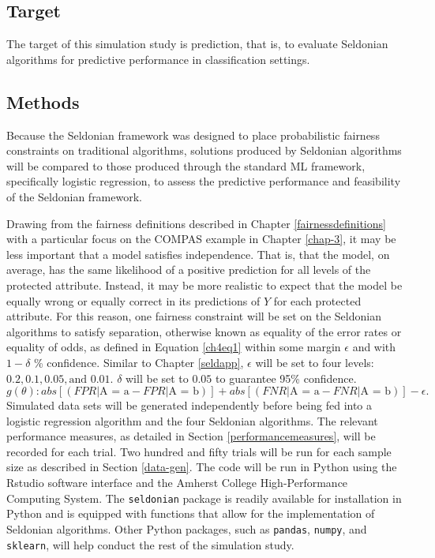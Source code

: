 \documentclass[12pt, twoside]{amherstthesis}
\begin{document}
\hypertarget{target}{%
\subsection{Target}\label{target}}

The target of this simulation study is prediction, that is, to evaluate Seldonian algorithms for predictive performance in classification settings.

\hypertarget{methods}{%
\subsection{Methods}\label{methods}}

Because the Seldonian framework was designed to place probabilistic fairness constraints on traditional algorithms, solutions produced by Seldonian algorithms will be compared to those produced through the standard ML framework, specifically logistic regression, to assess the predictive performance and feasibility of the Seldonian framework.

Drawing from the fairness definitions described in Chapter \ref{fairnessdefinitions} with a particular focus on the COMPAS example in Chapter \ref{chap-3}, it may be less important that a model satisfies independence. That is, that the model, on average, has the same likelihood of a positive prediction for all levels of the protected attribute. Instead, it may be more realistic to expect that the model be equally wrong or equally correct in its predictions of \(Y\) for each protected attribute. For this reason, one fairness constraint will be set on the Seldonian algorithms to satisfy separation, otherwise known as equality of the error rates or equality of odds, as defined in Equation \ref{ch4eq1} within some margin \(\epsilon\) and with \(1 - \delta\) \% confidence. Similar to Chapter \ref{seldapp}, \(\epsilon\) will be set to four levels: \(0.2, 0.1, 0.05, \text{and } 0.01\). \(\delta\) will be set to \(0.05\) to guarantee 95\% confidence.
\begin{equation}
\label{ch4eq1}
g(\theta): abs[(FPR | \text{A = a} - FPR | \text{A = b})] + abs[(FNR | \text{A = a} - FNR | \text{A = b})] - \epsilon.
\end{equation}
Simulated data sets will be generated independently before being fed into a logistic regression algorithm and the four Seldonian algorithms. The relevant performance measures, as detailed in Section \ref{performancemeasures}, will be recorded for each trial. Two hundred and fifty trials will be run for each sample size as described in Section \ref{data-gen}. The code will be run in Python using the Rstudio software interface and the Amherst College High-Performance Computing System. The \texttt{seldonian} package is readily available for installation in Python and is equipped with functions that allow for the implementation of Seldonian algorithms. Other Python packages, such as \texttt{pandas}, \texttt{numpy}, and \texttt{sklearn}, will help conduct the rest of the simulation study.
\end{document}
